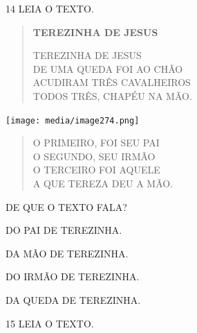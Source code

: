 \pagebreak

\num{14} LEIA O TEXTO. \enlargethispage{2\baselineskip}

\begin{myquote}
\begin{verse}
\textbf{TEREZINHA DE JESUS}

TEREZINHA DE JESUS\\
DE UMA QUEDA FOI AO CHÃO\\
ACUDIRAM TRÊS CAVALHEIROS\\
TODOS TRÊS, CHAPÉU NA MÃO.
\end{verse}

\vspace{1cm}

\begin{center}
\texttt{[image: media/image274.png]}
\end{center}

\vspace{1cm}

\begin{verse}
O PRIMEIRO, FOI SEU PAI\\
O SEGUNDO, SEU IRMÃO\\
O TERCEIRO FOI AQUELE\\
A QUE TEREZA DEU A MÃO.
\end{verse}

\end{myquote}

DE QUE O TEXTO FALA?

\begin{escolha}%
\item DO PAI DE TEREZINHA.

\item DA MÃO DE TEREZINHA.

\item DO IRMÃO DE TEREZINHA.

\item DA QUEDA DE TEREZINHA.
\end{escolha}

\pagebreak

\num{15} LEIA O TEXTO. \enlargethispage{2\baselineskip}

